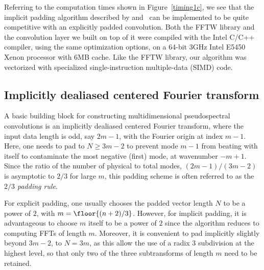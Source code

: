 \documentclass[final]{siamltex}
\begin{document}
Referring to the computation times shown in Figure~\ref{timing1c},
we see that the implicit padding algorithm described by  
and~
can be implemented to be quite competitive with an explicitly padded
convolution. Both the FFTW library and the convolution layer we built on
top of it were compiled with the Intel C/C++ compiler, using
the same optimization options, on a 64-bit 3GHz Intel E5450 Xenon processor
with 6MB cache. Like the FFTW library, our algorithm was vectorized with
specialized single-instruction multiple-data (SIMD) code. 

\subsection{Implicitly dealiased centered Fourier transform}\label{fft0}
A basic building block for constructing multidimensional pseudospectral
convolutions is an implicitly dealiased centered Fourier transform, where the
input data length is odd, say $2m-1$, with the Fourier origin at index $m-1$. 
Here, one needs to pad to $N\ge 3m-2$ to prevent 
mode $m-1$ from beating with itself to contaminate the most negative
(first) mode, at wavenumber $-m+1$. Since the ratio of the number of physical to
total modes, $(2m-1)/(3m-2)$ is asymptotic to $2/3$ for large $m$, this
padding scheme is often referred to as the {\it $2/3$ padding rule}.

For explicit padding, one usually chooses the padded vector length
$N$ to be a power of $2$, with $m=\floor{(n+2)/3}$. However, for implicit
padding, it is advantageous to choose $m$ itself to be a power of $2$
since the algorithm reduces to computing FFTs of length $m$.
Moreover, it is convenient to pad implicitly slightly beyond $3m-2$, to $N=3m$,
as this allow the use of a radix $3$ subdivision at the highest level, so
that only two of the three subtransforms of length $m$ need to be retained. 
\end{document}
